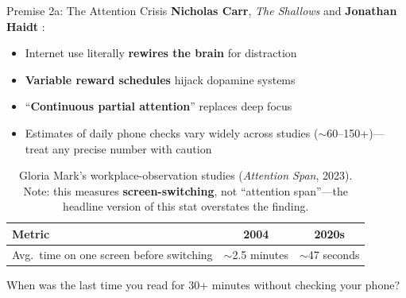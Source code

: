 ﻿\documentclass[aspectratio=169,11pt]{beamer}
\begin{document}
\begin{frame}{Premise 2a: The Attention Crisis}
\textbf{Nicholas Carr}, \textit{The Shallows} \parencite{carr_shallows} and \textbf{Jonathan Haidt} \parencite{haidt_anxious_generation}:

\begin{itemize}
    \item Internet use literally \textbf{rewires the brain} for distraction
    \item \textbf{Variable reward schedules} hijack dopamine systems
    \item ``\textbf{Continuous partial attention}'' replaces deep focus
    \item Estimates of daily phone checks vary widely across studies ($\sim$60--150+)---treat any precise number with caution
\end{itemize}

\vspace{0.3cm}
\begin{table}[h]
\centering
\small
\begin{tabular}{l c c}
\toprule
\textbf{Metric} & \textbf{2004} & \textbf{2020s} \\
\midrule
Avg.\ time on one screen before switching & $\sim$2.5 minutes & $\sim$47 seconds \\
\bottomrule
\end{tabular}
\caption{\small Gloria Mark's workplace-observation studies (\textit{Attention Span}, 2023). Note: this measures \textbf{screen-switching}, not ``attention span''---the headline version of this stat overstates the finding.}
\end{table}

\begin{discussionbox}[Discussion]
When was the last time you read for 30+ minutes without checking your phone?
\end{discussionbox}
\end{frame}
\end{document}
